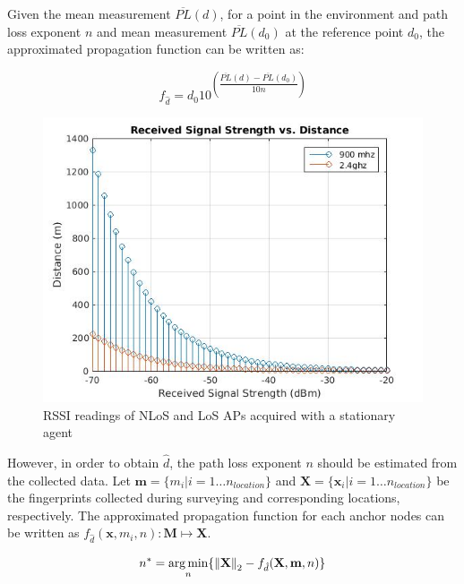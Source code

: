     Given the mean measurement $\overline{PL}(d)$, for a point in the environment and path loss exponent $n$ and mean measurement $\overline{PL}(d_0)$ at the reference point $d_0$, the approximated propagation function can be written as:

    \begin{equation}
      \label{eq:log-distance-d}
      f_{\hat{d}} = d_0 10^{\left(\dfrac{\overline{PL}(d)-\overline{PL}(d_0)}{10 n} \right)}
    \end{equation}

    \begin{figure}[thpb]
       \centering
       \includegraphics[width=\linewidth]{figures/rss-vs-distance.jpg}
       \caption{\label{fig:log-distance}RSSI readings of NLoS and LoS APs acquired with a stationary agent}
    \end{figure}

    However, in order to obtain $\hat{d}$, the path loss exponent $n$ should be estimated from the collected data.
    Let $\mathbf{m} = \{m_i | i=1 \ldots n_{location} \}$ and $\mathbf{X} = \{ \mathbf{x}_i | i = 1 \ldots n_{location}\}$ be the fingerprints collected during surveying and corresponding locations, respectively.
    The approximated propagation function for each anchor nodes can be written as $f_{\hat{d}}(\mathbf{x}, m_i, n): \mathbf{M} \mapsto \mathbf{X}$.

    \begin{equation}
      n^* = \operatorname*{arg\,min}_n \{\left\lVert\mathbf{X}\right\rVert_2 - f_{\hat{d}}(\mathbf{X}, \mathbf{m}, n)\}
    \end{equation}


